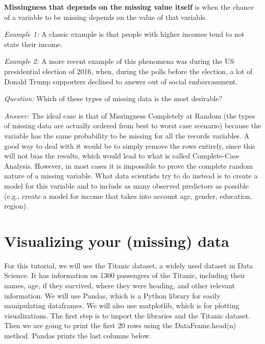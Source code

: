 \documentclass[a4paper]{article}
\begin{document}
\par\noindent \textbf{Missingness that depends on the missing value itself} is when the chance of a variable to be missing depends on the value of that variable.
\par\noindent \textit{Example 1:} A classic example is that people with higher incomes tend to not state their income.
\par\noindent \textit{Example 2:} A more recent example of this phenomena was during the US presidential election of 2016, when, during the polls before the election, a lot of Donald Trump supporters declined to answer out of social embarrassment.\\

\par\noindent \textit{Question:} Which of these types of missing data is the most desirable?
\par\noindent \textit{Answer: } The ideal case is that of Missingness Completely at Random (the types of missing data are actually ordered from best to worst case scenario) because the variable has the same probability to be missing for all the records variables. A good way to deal with it would be to simply remove the rows entirely, since this will not bias the results, which would lead to what is called Complete-Case Analysis. However, in most cases it is impossible to prove the complete random nature of a missing variable. What data scientists try to do instead is to create a model for this variable and to include as many observed predictors as possible (e.g., create a model for income that takes into account age, gender, education, region).

\section {Visualizing your (missing) data}

For this tutorial, we will use the Titanic dataset, a widely used dataset in Data Science. It has information on 1300 passengers of the Titanic, including their names, age, if they survived, where they were heading, and other relevant information. We will use Pandas, which is a Python library for easily manipulating dataframes. We will also use matplotlib, which is for plotting visualizations.
The first step is to import the libraries and the Titanic dataset. Then we are going to print the first 20 rows using the DataFrame.head(n) method. Pandas prints the last columns below.
\end{document}
